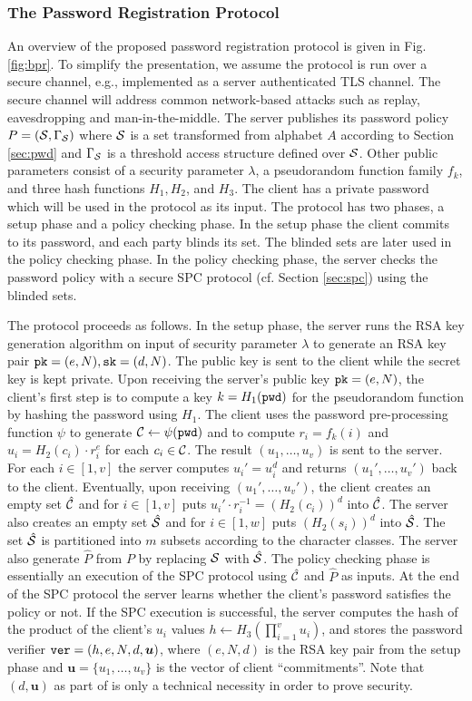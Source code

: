 \subsubsection{The Password Registration Protocol}

An overview of the proposed password registration protocol is given in Fig. \ref{fig:bpr}. 
To simplify the presentation, we assume the protocol is run over a secure channel, e.g., implemented as a server authenticated TLS channel. 
The secure channel will address common network-based attacks such as replay, eavesdropping and man-in-the-middle. The server publishes its password policy $P=(\mathcal{S},\Gamma_\mathcal{S})$ where $\mathcal{S}$ is a set transformed from alphabet $A$ according to Section \ref{sec:pwd} and $\Gamma_\mathcal{S}$ is a threshold access structure defined over $\mathcal{S}$. Other public parameters consist of a security parameter $\lambda$, a pseudorandom function family $f_k$, and three hash functions $H_1, H_2$, and $H_3$. The client has a private password \pwd which will be used in the protocol as its input. The protocol has two phases, a setup phase and a policy checking phase. In the setup phase the client commits to its password, and each party blinds its set. 
The blinded sets are later used in the policy checking phase. In the policy checking phase, the server checks the password policy with a secure SPC protocol (cf. Section \ref{sec:spc}) using the blinded sets.

The protocol proceeds as follows. 
In the setup phase, the server runs the RSA key generation algorithm on input of security parameter $\lambda$ to generate an RSA key pair $\mathtt{pk}=(e,N), \mathtt{sk}=(d,N)$. 
The public key is sent to the client while the secret key is kept private. 
Upon receiving the server's public key $\mathtt{pk}=(e,N)$, the client's first step is to compute a key $k=H_1(\mathtt{pwd})$ for the pseudorandom function by hashing the password using $H_1$. The client uses the password pre-processing function $\psi$ to generate $\mathcal{C}\gets\psi(\mathtt{pwd})$ and to compute $r_i=f_k(i)$ and $u_i=H_2(c_i)\cdot r_i^e$ for each $c_i\in\mathcal{C}$.
The result $(u_1,\ldots,u_v)$ is sent to the server.
For each $i\in[1,v]$ the server computes $u_i'=u_i^d$ and returns $(u_1',\ldots,u_v')$ back to the client. 
Eventually, upon receiving $(u_1',\ldots,u_v')$, the client creates an empty set $\hat{\mathcal{C}}$ and for $i\in[1,v]$ puts $u_i'\cdot r_i^{-1}=(H_2(c_i))^d$ into $\hat{\mathcal{C}}$. 
The server also creates an empty set $\hat{\mathcal{S}}$ and for $i\in[1,w]$ puts $(H_2(s_i))^d$ into $\hat{\mathcal{S}}$. The set $\hat{\mathcal{S}}$ is partitioned into $m$ subsets according to the character classes. The server also generate $\hat{P}$ from $P$ by replacing $\mathcal{S}$ with $\hat{\mathcal{S}}$.
The policy checking phase is essentially an execution of  the SPC protocol using $\hat{\mathcal{C}}$ and $\hat{P}$ as inputs. At the end of the SPC protocol the server learns whether the client's password satisfies the policy or not. If the SPC execution is successful, the server computes the hash of the product of the client's $u_i$ values $h\gets H_3(\prod_{i=1}^v u_i)$, and stores the password verifier $\mathtt{ver} = (h,e,N,d,\bm{u})$, where $(e,N,d)$ is the RSA key pair from the setup phase and $\bm{u}=\{u_1,\dots,u_v\}$ is the vector of client ``commitments''.
Note that $(d, \bm{u})$ as part of \ver is only a technical necessity in order to prove security.

